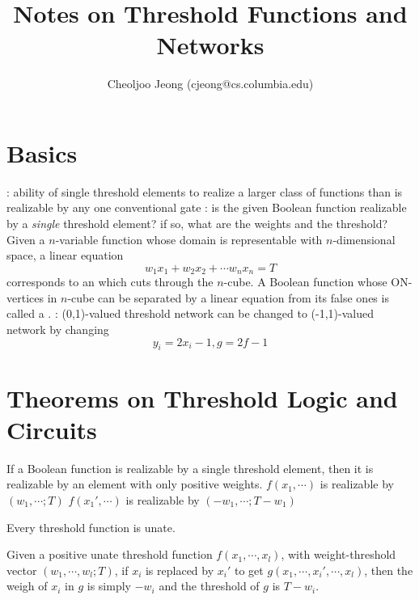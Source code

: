 \documentclass{myproc}
\begin{document}
\small

\title{\large\bf Notes on Threshold Functions and Networks}
\author{\small Cheoljoo Jeong (cjeong@cs.columbia.edu)}
\maketitle

\section{Basics}
\bit
\w {}: ability of single threshold elements to realize a larger
class of functions than is realizable by any one conventional gate
\w {}: is the given Boolean function
realizable by a {\em single\/} threshold element? if so, what are the weights
and the threshold?
\w Given a $n$-variable function whose domain is representable with
$n$-dimensional space, a linear equation
   \[ w_1x_1 + w_2x_2 + \cdots w_nx_n = T\]
corresponds to an  which cuts through the
$n$-cube. 
\w A Boolean function whose ON-vertices in $n$-cube can be separated by a
linear equation from its false ones is called a . 
\w {}: (0,1)-valued threshold network can be changed
to (-1,1)-valued network by changing 
   \[ y_i = 2x_i - 1,   g = 2f - 1\]
\eit


\section{Theorems on Threshold Logic and Circuits}
\begin{theorem}
\cite[page 184]{Kohavi78} If a Boolean function is realizable
by a single threshold element, then it is realizable by an element with only
positive weights.
   \bit
   \w $f(x_1, \cdots)$ is realizable by $(w_1, \cdots; T)$
   \w $f(x_1', \cdots)$ is realizable by
      $(-w_1, \cdots; T - w_1)$
   \eit
\end{theorem}

\begin{theorem}
\cite[page 190]{Kohavi78} Every threshold function is unate. 
\end{theorem}

\begin{theorem}
\cite{Muroga71}
 Given a positive unate threshold function
$f(x_1, \cdots, x_l)$, with weight-threshold vector $(w_1, \cdots, w_l; T)$,
if $x_i$ is replaced by $x_i'$ to get $g(x_1, \cdots, x_i', \cdots, x_l)$,
then the weigh of $x_i$ in $g$ is simply $-w_i$ and the threshold of $g$ is
$T - w_i$.
\end{theorem}
\end{document}
